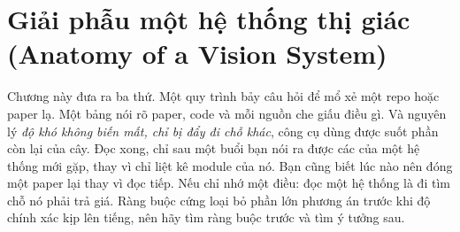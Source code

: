 \documentclass[../../deep_learning.tex]{subfiles}
\begin{document}
\chapter{Giải phẫu một hệ thống thị giác (Anatomy of a Vision System)}

\begin{tomtat}
Chương này đưa ra ba thứ. Một quy trình bảy câu hỏi để mổ xẻ một repo hoặc paper lạ. Một bảng nói rõ paper, code và  mỗi nguồn che giấu điều gì. Và nguyên lý \emph{độ khó không biến mất, chỉ bị đẩy đi chỗ khác}, công cụ dùng được suốt phần còn lại của cây. Đọc xong, chỉ sau một buổi bạn nói ra được các  của một hệ thống mới gặp, thay vì chỉ liệt kê module của nó. Bạn cũng biết lúc nào nên đóng một paper lại thay vì đọc tiếp. Nếu chỉ nhớ một điều: đọc một hệ thống là đi tìm chỗ nó phải trả giá. Ràng buộc cứng loại bỏ phần lớn phương án trước khi độ chính xác kịp lên tiếng, nên hãy tìm ràng buộc trước và tìm ý tưởng sau.
\end{tomtat}
\end{document}
